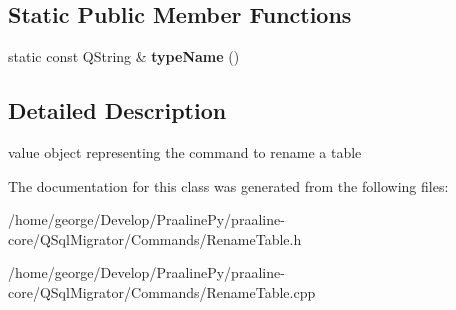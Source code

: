 \subsection*{Static Public Member Functions}
\begin{DoxyCompactItemize}
\item 
\mbox{\label{class_q_sql_migrator_1_1_commands_1_1_rename_table_abbb21c0d8e20a6f3311909ece1106691}} 
static const Q\+String \& {\bfseries type\+Name} ()
\end{DoxyCompactItemize}


\subsection{Detailed Description}
value object representing the command to rename a table 

The documentation for this class was generated from the following files\+:\begin{DoxyCompactItemize}
\item 
/home/george/\+Develop/\+Praaline\+Py/praaline-\/core/\+Q\+Sql\+Migrator/\+Commands/Rename\+Table.\+h\item 
/home/george/\+Develop/\+Praaline\+Py/praaline-\/core/\+Q\+Sql\+Migrator/\+Commands/Rename\+Table.\+cpp\end{DoxyCompactItemize}

